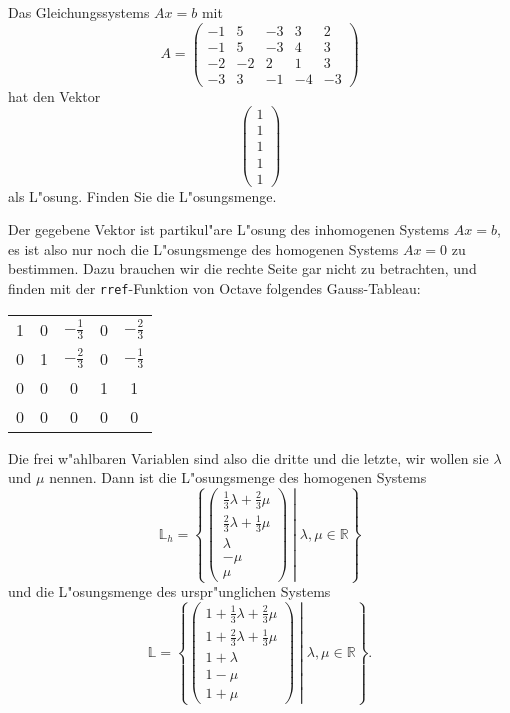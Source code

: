 Das Gleichungssystems $Ax=b$ mit
\[
A=\begin{pmatrix}
-1& 5&-3& 3& 2\\
-1& 5&-3& 4& 3\\
-2&-2& 2& 1& 3\\
-3& 3&-1&-4&-3
\end{pmatrix}
\]
hat den Vektor
\[
\begin{pmatrix}1\\1\\1\\1\\1\end{pmatrix}
\]
als L"osung.
Finden Sie die L"osungsmenge.

\begin{loesung}
Der gegebene Vektor ist partikul"are L"osung des inhomogenen Systems
$Ax=b$, es ist also nur noch die L"osungsmenge des homogenen Systems
$Ax=0$ zu bestimmen.
Dazu brauchen wir die rechte Seite gar nicht zu betrachten,
und finden mit der {\tt rref}-Funktion von Octave folgendes Gauss-Tableau:
\begin{center}
\begin{tabular}{|ccccc|}
\hline
1&0&$-\frac13$&0&$-\frac23$\\
0&1&$-\frac23$&0&$-\frac13$\\
0&0&         0&1&1\\
0&0&         0&0&0\\
\hline
\end{tabular}
\end{center}
Die frei w"ahlbaren Variablen sind also die dritte und die letzte,
wir wollen sie $\lambda$ und $\mu$ nennen. Dann ist die L"osungsmenge
des homogenen Systems
\[
{\mathbb L}_h
=
\left\{
\left.
\begin{pmatrix}
\frac13\lambda+\frac23\mu\\
\frac23\lambda+\frac13\mu\\
\lambda\\
-\mu\\
\mu
\end{pmatrix}
\;
\right|
\;
\lambda,\mu\in\mathbb R
\right\}
\]
und die L"osungsmenge des urspr"unglichen Systems
\[
{\mathbb L}
=
\left\{
\left.
\begin{pmatrix}
1+\frac13\lambda+\frac23\mu\\
1+\frac23\lambda+\frac13\mu\\
1+\lambda\\
1-\mu\\
1+\mu
\end{pmatrix}
\;
\right|
\;
\lambda,\mu\in\mathbb R
\right\}.
\]
\end{loesung}
